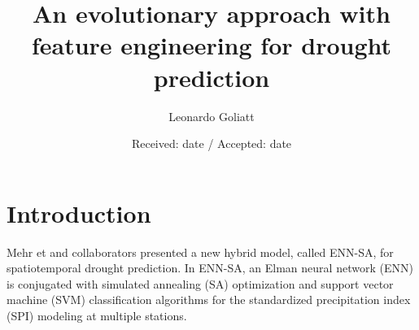 \documentclass[smallextended]{svjour3}       %
\begin{document}
\title{
An evolutionary approach with feature engineering  for drought prediction
}


\author{
        Leonardo Goliatt  {\large *}
        }



\date{Received: date / Accepted: date}


\maketitle              %
%
\begin{abstract}

\end{abstract}
%
%
%
\section{Introduction}\label{sec:intro}


Mehr et and collaborators \cite{danandehmehr2020neuroannealing}
presented a new hybrid model, called ENN-SA, for spatiotemporal drought prediction. In ENN-SA, an Elman neural network (ENN) is conjugated with simulated annealing (SA) optimization and support vector machine (SVM) classification algorithms for the standardized precipitation index (SPI) modeling at multiple stations.
\end{document}
